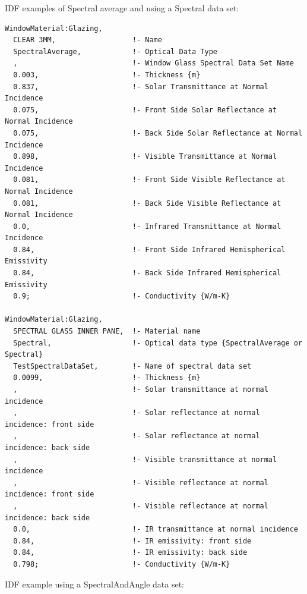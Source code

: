 IDF examples of Spectral average and using a Spectral data set:

\begin{lstlisting}
WindowMaterial:Glazing,
  CLEAR 3MM,                  !- Name
  SpectralAverage,            !- Optical Data Type
  ,                           !- Window Glass Spectral Data Set Name
  0.003,                      !- Thickness {m}
  0.837,                      !- Solar Transmittance at Normal Incidence
  0.075,                      !- Front Side Solar Reflectance at Normal Incidence
  0.075,                      !- Back Side Solar Reflectance at Normal Incidence
  0.898,                      !- Visible Transmittance at Normal Incidence
  0.081,                      !- Front Side Visible Reflectance at Normal Incidence
  0.081,                      !- Back Side Visible Reflectance at Normal Incidence
  0.0,                        !- Infrared Transmittance at Normal Incidence
  0.84,                       !- Front Side Infrared Hemispherical Emissivity
  0.84,                       !- Back Side Infrared Hemispherical Emissivity
  0.9;                        !- Conductivity {W/m-K}

WindowMaterial:Glazing,
  SPECTRAL GLASS INNER PANE,  !- Material name
  Spectral,                   !- Optical data type {SpectralAverage or Spectral}
  TestSpectralDataSet,        !- Name of spectral data set
  0.0099,                     !- Thickness {m}
  ,                           !- Solar transmittance at normal incidence
  ,                           !- Solar reflectance at normal incidence: front side
  ,                           !- Solar reflectance at normal incidence: back side
  ,                           !- Visible transmittance at normal incidence
  ,                           !- Visible reflectance at normal incidence: front side
  ,                           !- Visible reflectance at normal incidence: back side
  0.0,                        !- IR transmittance at normal incidence
  0.84,                       !- IR emissivity: front side
  0.84,                       !- IR emissivity: back side
  0.798;                      !- Conductivity {W/m-K}
\end{lstlisting}

IDF example using a SpectralAndAngle data set:

